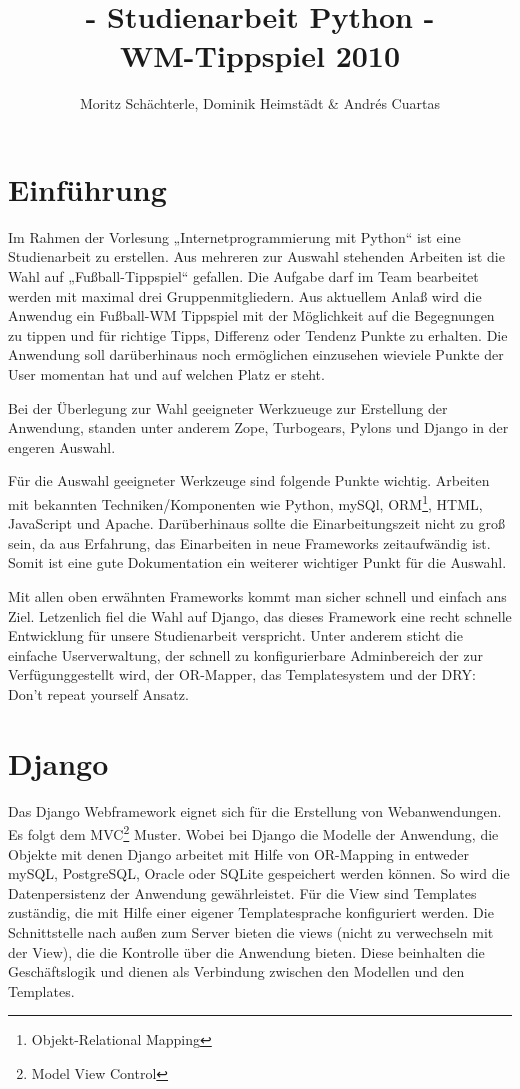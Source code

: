 \documentclass[titlepage, 12pt,a4paper]{scrartcl}
\author{Moritz Schächterle, Dominik Heimstädt \& Andrés Cuartas}
\title{- Studienarbeit Python - \\ WM-Tippspiel 2010 \\}
\begin{document}
\maketitle
\newpage

\tableofcontents
\newpage

\section{Einführung}
Im Rahmen der Vorlesung „Internetprogrammierung mit Python“ ist eine
Studienarbeit zu erstellen. Aus mehreren zur Auswahl stehenden Arbeiten ist die
Wahl auf „Fußball-Tippspiel“ gefallen. Die Aufgabe darf im Team bearbeitet
werden mit maximal drei Gruppenmitgliedern. Aus aktuellem Anlaß wird die
Anwendug ein Fußball-WM Tippspiel mit der Möglichkeit auf die Begegnungen zu
tippen und für richtige Tipps, Differenz oder Tendenz Punkte zu erhalten. Die
Anwendung soll darüberhinaus noch ermöglichen einzusehen wieviele Punkte der
User momentan hat und auf welchen Platz er steht.

Bei der Überlegung zur Wahl geeigneter Werkzueuge zur Erstellung der Anwendung,
standen unter anderem Zope, Turbogears, Pylons und Django in der engeren
Auswahl.

Für die Auswahl geeigneter Werkzeuge sind folgende Punkte wichtig.
Arbeiten mit bekannten Techniken/Komponenten wie Python, mySQl,
ORM\footnote{Objekt-Relational Mapping}, HTML, JavaScript und Apache. 
Darüberhinaus sollte die Einarbeitungszeit nicht zu groß sein, da aus
Erfahrung, das Einarbeiten in neue Frameworks zeitaufwändig ist. Somit ist eine
gute Dokumentation ein weiterer wichtiger Punkt für die Auswahl.

Mit allen oben erwähnten Frameworks kommt man sicher schnell und einfach ans
Ziel. Letzenlich fiel die Wahl auf Django, das dieses Framework eine recht
schnelle Entwicklung für unsere Studienarbeit verspricht. Unter anderem sticht
die einfache Userverwaltung, der schnell zu konfigurierbare Adminbereich der
zur Verfügunggestellt wird, der OR-Mapper, das Templatesystem und der DRY: Don't
repeat yourself Ansatz. 

\section{Django}
Das Django Webframework eignet sich für die Erstellung von Webanwendungen. Es
folgt dem MVC\footnote{Model View Control} Muster. Wobei bei Django die Modelle
der Anwendung, die Objekte mit denen Django arbeitet mit Hilfe von OR-Mapping
in entweder mySQL, PostgreSQL, Oracle oder SQLite gespeichert werden können. So
wird die Datenpersistenz der Anwendung gewährleistet. Für die View sind
Templates zuständig, die mit Hilfe einer eigener Templatesprache konfiguriert
werden. Die Schnittstelle nach außen zum Server bieten die views (nicht zu
verwechseln mit der View), die die Kontrolle über die Anwendung bieten. Diese
beinhalten die Geschäftslogik und dienen als Verbindung zwischen den Modellen
und den Templates.
\end{document}

